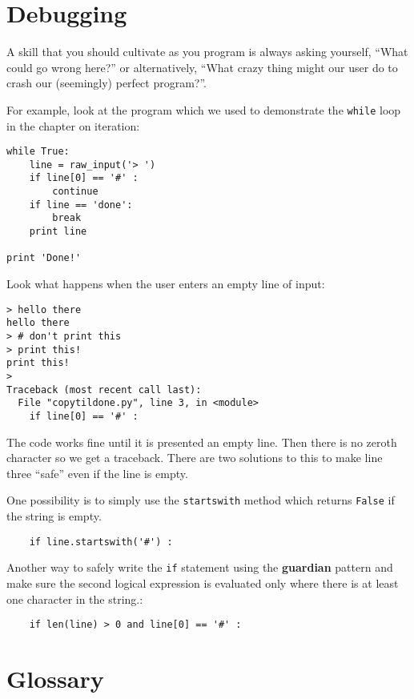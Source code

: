 \section{Debugging}

A skill that you should cultivate as you program is always
asking yourself, ``What could go wrong here?'' or alternatively,
``What crazy thing might our user do to crash our (seemingly) 
perfect program?''.

For example, look at the program which we used to demonstrate
the {\tt while} loop in the chapter on iteration:

\beforeverb
\begin{verbatim}
while True:
    line = raw_input('> ')
    if line[0] == '#' :
        continue
    if line == 'done':
        break
    print line

print 'Done!'
\end{verbatim}
\afterverb
%
Look what happens when the user enters an empty line of input:

\beforeverb
\begin{verbatim}
> hello there
hello there
> # don't print this
> print this!
print this!
> 
Traceback (most recent call last):
  File "copytildone.py", line 3, in <module>
    if line[0] == '#' :
\end{verbatim}
\afterverb
%
The code works fine until it is presented an empty line.  Then
there is no zeroth character so we get a traceback.  There are two
solutions to this to make line three ``safe'' even if the line is 
empty.

One possibility is to simply use the {\tt startswith} method
which returns {\tt False} if the string is empty.

\beforeverb
\begin{verbatim}
    if line.startswith('#') :
\end{verbatim}
\afterverb
%
Another way to safely write the {\tt if} statement using the {\bf guardian}
pattern and make sure the second logical expression is evaluated 
only where there is at least one character in the string.:

\beforeverb
\begin{verbatim}
    if len(line) > 0 and line[0] == '#' :
\end{verbatim}
\afterverb
%

\section{Glossary}


